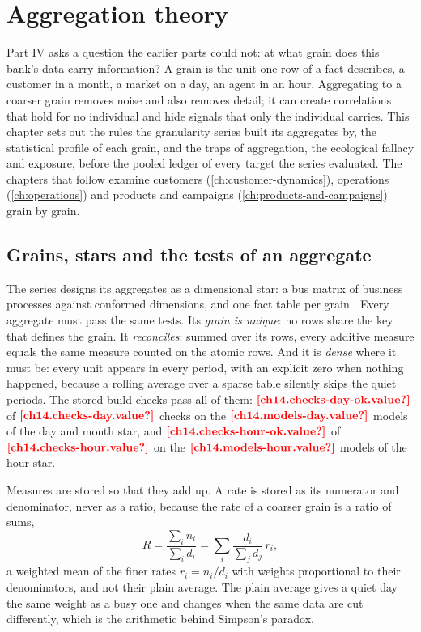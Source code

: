 \chapter{Aggregation theory}\label{ch:aggregation}

Part IV asks a question the earlier parts could not: at what grain does this bank's data carry information? A grain is
the unit one row of a fact describes, a customer in a month, a market on a day, an agent in an hour. Aggregating to a
coarser grain removes noise and also removes detail; it can create correlations that hold for no individual and hide
signals that only the individual carries. This chapter sets out the rules the granularity series built its aggregates
by, the statistical profile of each grain, and the traps of aggregation, the ecological fallacy and exposure, before
the pooled ledger of every target the series evaluated. The chapters that follow examine customers
(\cref{ch:customer-dynamics}), operations (\cref{ch:operations}) and products and campaigns
(\cref{ch:products-and-campaigns}) grain by grain.

\section{Grains, stars and the tests of an aggregate}\label{sec:ag2-star}

The series designs its aggregates as a dimensional star: a bus matrix of business processes against conformed dimensions,
and one fact table per grain \autocite{kimball2013}. Every aggregate must pass the same tests. Its \emph{grain is unique}: no rows share the key that defines the grain. It \emph{reconciles}: summed over its rows, every additive measure equals the
same measure counted on the atomic rows. And it is \emph{dense} where it must be: every unit appears in every period, with
an explicit zero when nothing happened, because a rolling average over a sparse table silently skips the quiet periods. The
stored build checks pass all of them: $\est{ch14.checks-day-ok}{value}$ of $\est{ch14.checks-day}{value}$ checks on the
$\est{ch14.models-day}{value}$ models of the day and month star, and $\est{ch14.checks-hour-ok}{value}$ of
$\est{ch14.checks-hour}{value}$ on the $\est{ch14.models-hour}{value}$ models of the hour star.

Measures are stored so that they add up. A rate is stored as its numerator and denominator, never as a ratio, because the
rate of a coarser grain is a ratio of sums,
\begin{equation}\label{eq:ag2-ratio}
  R = \frac{\sum_i n_i}{\sum_i d_i} = \sum_i \frac{d_i}{\sum_j d_j}\, r_i ,
\end{equation}
a weighted mean of the finer rates $r_i = n_i / d_i$ with weights proportional to their denominators, and not their
plain average. The plain average gives a quiet day the same weight as a busy one and changes when the same data are cut
differently, which is the arithmetic behind Simpson's paradox.

